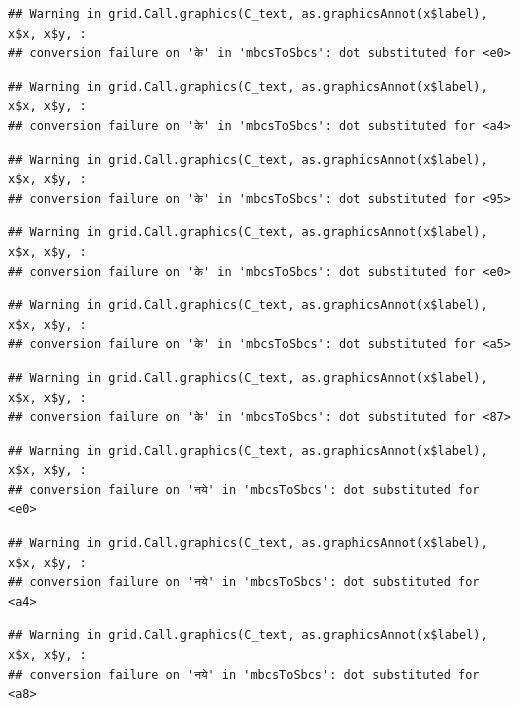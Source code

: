 \documentclass[
]{article}
\begin{document}
\begin{verbatim}
## Warning in grid.Call.graphics(C_text, as.graphicsAnnot(x$label), x$x, x$y, :
## conversion failure on 'के' in 'mbcsToSbcs': dot substituted for <e0>
\end{verbatim}

\begin{verbatim}
## Warning in grid.Call.graphics(C_text, as.graphicsAnnot(x$label), x$x, x$y, :
## conversion failure on 'के' in 'mbcsToSbcs': dot substituted for <a4>
\end{verbatim}

\begin{verbatim}
## Warning in grid.Call.graphics(C_text, as.graphicsAnnot(x$label), x$x, x$y, :
## conversion failure on 'के' in 'mbcsToSbcs': dot substituted for <95>
\end{verbatim}

\begin{verbatim}
## Warning in grid.Call.graphics(C_text, as.graphicsAnnot(x$label), x$x, x$y, :
## conversion failure on 'के' in 'mbcsToSbcs': dot substituted for <e0>
\end{verbatim}

\begin{verbatim}
## Warning in grid.Call.graphics(C_text, as.graphicsAnnot(x$label), x$x, x$y, :
## conversion failure on 'के' in 'mbcsToSbcs': dot substituted for <a5>
\end{verbatim}

\begin{verbatim}
## Warning in grid.Call.graphics(C_text, as.graphicsAnnot(x$label), x$x, x$y, :
## conversion failure on 'के' in 'mbcsToSbcs': dot substituted for <87>
\end{verbatim}

\begin{verbatim}
## Warning in grid.Call.graphics(C_text, as.graphicsAnnot(x$label), x$x, x$y, :
## conversion failure on 'नये' in 'mbcsToSbcs': dot substituted for <e0>
\end{verbatim}

\begin{verbatim}
## Warning in grid.Call.graphics(C_text, as.graphicsAnnot(x$label), x$x, x$y, :
## conversion failure on 'नये' in 'mbcsToSbcs': dot substituted for <a4>
\end{verbatim}

\begin{verbatim}
## Warning in grid.Call.graphics(C_text, as.graphicsAnnot(x$label), x$x, x$y, :
## conversion failure on 'नये' in 'mbcsToSbcs': dot substituted for <a8>
\end{verbatim}
\end{document}
